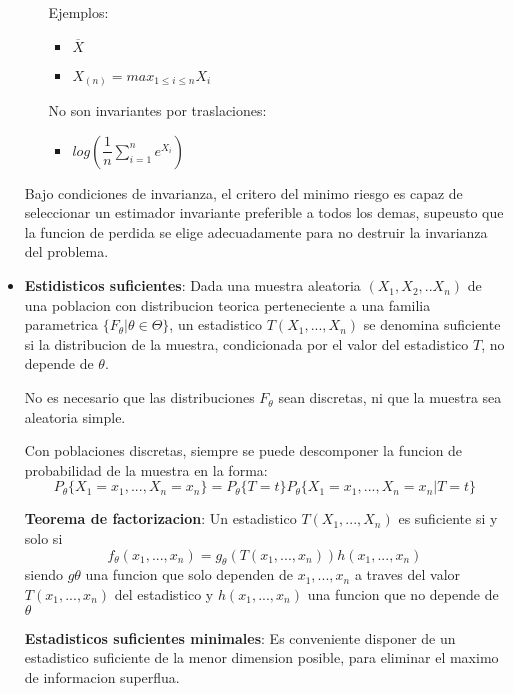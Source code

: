 \documentclass[10pt]{extarticle}
\newcommand{\<}{\langle}
\renewcommand{\>}{\rangle}
\theoremstyle{definition}
\begin{document}
\begin{itemize}
\begin{itemize}
                Ejemplos:
                \begin{itemize}
                  \item $\overline{X}$
                  \item $X_{(n)} = max_{1\leq i\leq n}X_i$
                \end{itemize}

                No son invariantes por traslaciones:
                \begin{itemize}
                  \item $log(\dfrac{1}{n} \sum_{i=1}^n e^{X_i})$
                \end{itemize}
        \end{itemize}
        Bajo condiciones de invarianza, el critero del minimo riesgo es capaz de seleccionar un estimador invariante preferible a todos los demas, supeusto que la funcion de perdida se elige adecuadamente para no destruir la invarianza del problema.
  \item \textbf{Estidisticos suficientes}: Dada una muestra aleatoria $(X_1, X_2,.. X_n)$ de una poblacion con distribucion teorica perteneciente a una familia parametrica $\{F_\theta | \theta \in \Theta \}$, un estadistico $T(X_1,..., X_n)$ se denomina suficiente si la distribucion de la muestra, condicionada por el valor del estadistico $T$, no depende de $\theta$.

        No es necesario que las distribuciones $F_\theta$ sean discretas, ni que la muestra sea aleatoria simple.

        Con poblaciones discretas, siempre se puede descomponer la funcion de probabilidad de la muestra en la forma:
        \begin{equation*}
          P_\theta \{ X_1 = x_1,..., X_n=x_n  \} = P_\theta\{ T=t \} P_\theta \{ X_1=x_1,..., X_n=x_n | T = t \}
        \end{equation*}

        \textbf{Teorema de factorizacion}:
        Un estadistico $T(X_1,..., X_n)$ es suficiente si y solo si
        \begin{equation*}
          f_\theta(x_1,...,x_n)=g_\theta(T(x_1,...,x_n))h(x_1,...,x_n)
        \end{equation*}
        siendo $g\theta$ una funcion que solo dependen de $x_1,...,x_n$ a traves del valor $T(x_1,...,x_n)$ del estadistico y $h(x_1,...,x_n)$ una funcion que no depende de $\theta$

        \textbf{Estadisticos suficientes minimales}: Es conveniente disponer de un estadistico suficiente de la menor dimension posible, para eliminar el maximo de informacion superflua.


\end{itemize}
\end{document}
